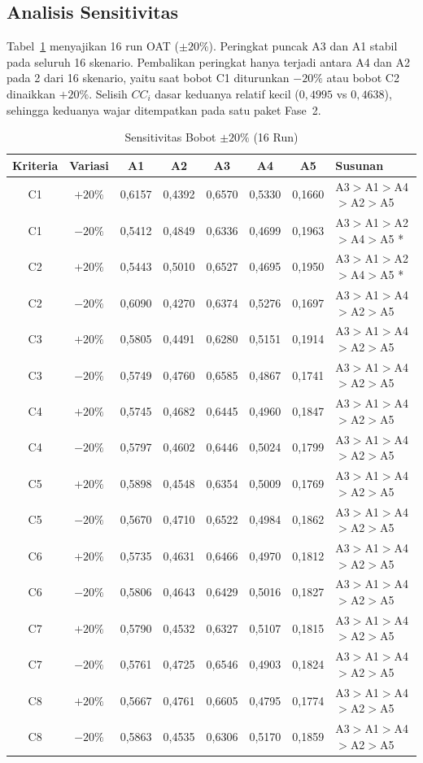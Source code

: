 \documentclass[10pt,twocolumn,a4paper]{article}
\begin{document}
\subsection{Analisis Sensitivitas}
Tabel~\ref{tab:sens} menyajikan 16 run OAT ($\pm20\%$). Peringkat puncak A3 dan A1 stabil pada seluruh 16 skenario. Pembalikan peringkat hanya terjadi antara A4 dan A2 pada 2 dari 16 skenario, yaitu saat bobot C1 diturunkan $-20\%$ atau bobot C2 dinaikkan $+20\%$. Selisih $CC_i$ dasar keduanya relatif kecil ($0{,}4995$ vs $0{,}4638$), sehingga keduanya wajar ditempatkan pada satu paket Fase~2.

\begin{table}[t]
\caption{Sensitivitas Bobot $\pm20\%$ (16 Run)}
\label{tab:sens}
\centering
\footnotesize
\begin{tabular}{@{}c c c c c c c l@{}}
\toprule
Kriteria & Variasi & A1 & A2 & A3 & A4 & A5 & Susunan \\
\midrule
C1 & $+20\%$ & 0,6157 & 0,4392 & 0,6570 & 0,5330 & 0,1660 & A3$>$A1$>$A4$>$A2$>$A5 \\
C1 & $-20\%$ & 0,5412 & 0,4849 & 0,6336 & 0,4699 & 0,1963 & A3$>$A1$>$A2$>$A4$>$A5 * \\
C2 & $+20\%$ & 0,5443 & 0,5010 & 0,6527 & 0,4695 & 0,1950 & A3$>$A1$>$A2$>$A4$>$A5 * \\
C2 & $-20\%$ & 0,6090 & 0,4270 & 0,6374 & 0,5276 & 0,1697 & A3$>$A1$>$A4$>$A2$>$A5 \\
C3 & $+20\%$ & 0,5805 & 0,4491 & 0,6280 & 0,5151 & 0,1914 & A3$>$A1$>$A4$>$A2$>$A5 \\
C3 & $-20\%$ & 0,5749 & 0,4760 & 0,6585 & 0,4867 & 0,1741 & A3$>$A1$>$A4$>$A2$>$A5 \\
C4 & $+20\%$ & 0,5745 & 0,4682 & 0,6445 & 0,4960 & 0,1847 & A3$>$A1$>$A4$>$A2$>$A5 \\
C4 & $-20\%$ & 0,5797 & 0,4602 & 0,6446 & 0,5024 & 0,1799 & A3$>$A1$>$A4$>$A2$>$A5 \\
C5 & $+20\%$ & 0,5898 & 0,4548 & 0,6354 & 0,5009 & 0,1769 & A3$>$A1$>$A4$>$A2$>$A5 \\
C5 & $-20\%$ & 0,5670 & 0,4710 & 0,6522 & 0,4984 & 0,1862 & A3$>$A1$>$A4$>$A2$>$A5 \\
C6 & $+20\%$ & 0,5735 & 0,4631 & 0,6466 & 0,4970 & 0,1812 & A3$>$A1$>$A4$>$A2$>$A5 \\
C6 & $-20\%$ & 0,5806 & 0,4643 & 0,6429 & 0,5016 & 0,1827 & A3$>$A1$>$A4$>$A2$>$A5 \\
C7 & $+20\%$ & 0,5790 & 0,4532 & 0,6327 & 0,5107 & 0,1815 & A3$>$A1$>$A4$>$A2$>$A5 \\
C7 & $-20\%$ & 0,5761 & 0,4725 & 0,6546 & 0,4903 & 0,1824 & A3$>$A1$>$A4$>$A2$>$A5 \\
C8 & $+20\%$ & 0,5667 & 0,4761 & 0,6605 & 0,4795 & 0,1774 & A3$>$A1$>$A4$>$A2$>$A5 \\
C8 & $-20\%$ & 0,5863 & 0,4535 & 0,6306 & 0,5170 & 0,1859 & A3$>$A1$>$A4$>$A2$>$A5 \\
\bottomrule
\end{tabular}
\end{table}
\end{document}
